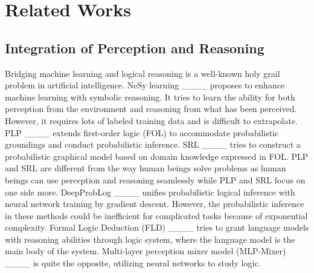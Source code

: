 \section{Related Works}
\subsection{Integration of Perception and Reasoning} 
Bridging machine learning and logical reasoning is a well-known holy grail problem in artificial intelligence. NeSy learning ____ proposes to enhance machine learning with symbolic reasoning. It tries to learn the ability for both perception from the environment and reasoning from what has been perceived. However, it requires lots of labeled training data and is difficult to extrapolate. PLP ____ extends first-order logic (FOL) to accommodate probabilistic groundings and conduct probabilistic inference. SRL ____ tries to construct a probabilistic graphical model based on domain knowledge expressed in FOL. PLP and SRL are different from the way human beings solve problems as human beings can use perception and reasoning seamlessly while PLP and SRL focus on one side more. DeepProbLog ____ unifies probabilistic logical inference with neural network training by gradient descent. However, the probabilistic inference in these methods could be inefficient for complicated tasks because of exponential complexity. Formal Logic Deduction (FLD) ____ tries to grant language models with reasoning abilities through logic system, where the language model is the main body of the system. Multi-layer perception mixer model (MLP-Mixer) ____ is quite the opposite, utilizing neural networks to study logic.

